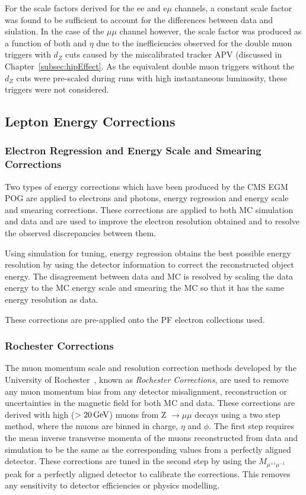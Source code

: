 For the scale factors derived for the ee and e$\mu$ channels, a constant scale factor was found to be sufficient to account for the differences between data and siulation.
In the case of the $\mu\mu$ channel however, the scale factor was produced as a function of both \pt and $\eta$ due to the inefficiencies observed for the double muon triggers with $d_{Z}$ cuts caused by the miscalibrated tracker APV (discussed in Chapter~\ref{subsec:hipEffect}.
As the equivalent double muon triggers without the $d_{Z}$ cuts were pre-scaled during runs with high instantaneous luminosity, these triggers were not considered.

\subsection{Lepton Energy Corrections}\label{subsec:leptonEnergyCorrections}
\subsubsection{Electron Regression and Energy Scale and Smearing Corrections}
Two types of energy corrections which have been produced by the CMS EGM POG are applied to electrons and photons, energy regression and energy scale and smearing corrections.
These corrections are applied to both MC simulation and data and are used to improve the electron resolution obtained and to resolve the observed discrepancies between them.

Using simulation for tuning, energy regression obtains the best possible energy resolution by using the detector information to correct the reconstructed object energy.
The disagreement between data and MC is resolved by scaling the data energy to the MC energy scale and smearing the MC so that it has the same energy resolution as data. 

These corrections are pre-applied onto the PF electron collections used.

\subsubsection{Rochester Corrections}
The muon momentum scale and resolution correction methods developed by the University of Rochester~\cite{rochester}, known as \emph{Rochester Corrections}, are used to remove any muon momentum bias from any detector misalignment, reconstruction or uncertainties in the magnetic field for both MC and data.
These corrections are derived with high \pt ($> 20\,\text{Ge\hspace{-.08em}V}$) muons from Z $ \rightarrow \mu\mu$ decays using a two step method, where the muons are binned in charge, $\eta$ and $\phi$.
The first step requires the mean inverse transverse momenta of the muons reconstructed from data and simulation to be the same as the corresponding values from a perfectly aligned detector.
These corrections are tuned in the second step by using the $M_{\mu^{+1}\mu^{-1}}$ peak for a perfectly aligned detector to calibrate the corrections.
This removes any sensitivity to detector efficiencies or physics modelling.


